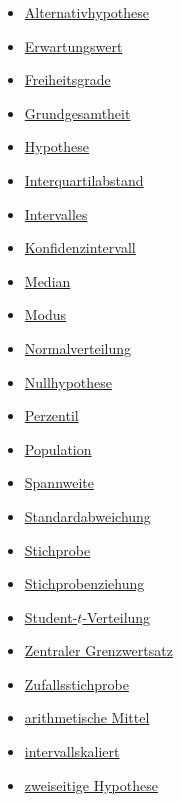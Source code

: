 \documentclass[
]{book}
\providecommand{\tightlist}{%
  \setlength{\itemsep}{0pt}\setlength{\parskip}{0pt}}
\theoremstyle{definition}
\theoremstyle{definition}
\theoremstyle{definition}
\theoremstyle{definition}
\theoremstyle{remark}
\begin{document}
\begin{itemize}
\tightlist
\item
  \hyperref[customdef-alternativhypothese]{Alternativhypothese}
\item
  \hyperref[customdef-erwartungswert]{Erwartungswert}
\item
  \hyperref[customdef-freiheitsgrade]{Freiheitsgrade}
\item
  \hyperref[customdef-grundgesamtheit]{Grundgesamtheit}
\item
  \hyperref[customdef-hypothese]{Hypothese}
\item
  \hyperref[customdef-iqr]{Interquartilabstand}
\item
  \hyperref[customdef-interval]{Intervalles}
\item
  \hyperref[customdef-confidence-interval]{Konfidenzintervall}
\item
  \hyperref[customdef-median]{Median}
\item
  \hyperref[customdef-modus]{Modus}
\item
  \hyperref[customdef-normalverteilung]{Normalverteilung}
\item
  \hyperref[customdef-nullhypothese]{Nullhypothese}
\item
  \hyperref[customdef-perzentil]{Perzentil}
\item
  \hyperref[customdef-population]{Population}
\item
  \hyperref[customdef-spannweite]{Spannweite}
\item
  \hyperref[customdef-std]{Standardabweichung}
\item
  \hyperref[customdef-stichprobe]{Stichprobe}
\item
  \hyperref[customdef-stichprobenziehung]{Stichprobenziehung}
\item
  \hyperref[customdef-student-verteilung]{Student-\(t\)-Verteilung}
\item
  \hyperref[customdef-zentraler-grenzwertsatz]{Zentraler Grenzwertsatz}
\item
  \hyperref[customdef-zufallsstichprobe]{Zufallsstichprobe}
\item
  \hyperref[customdef-arithmetisches-mittel]{arithmetische Mittel}
\item
  \hyperref[customdef-intervallskaliert]{intervallskaliert}
\item
  \hyperref[customdef-zweiseitige-hypothese]{zweiseitige Hypothese}
\end{itemize}

  
\end{document}
